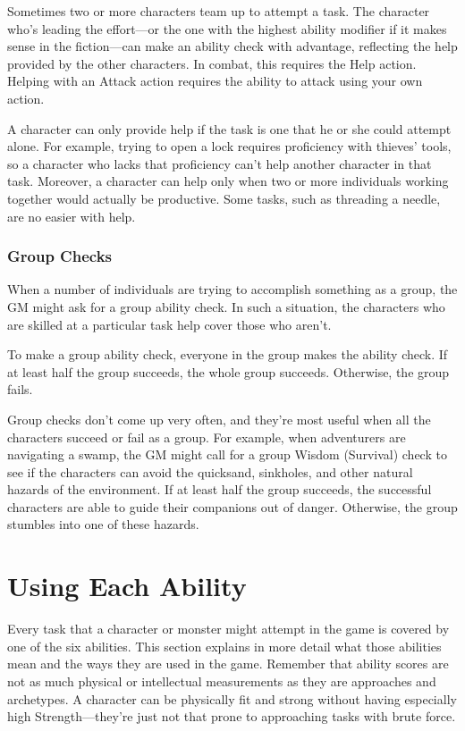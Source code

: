 Sometimes two or more characters team up to attempt a task. The character who's leading the effort---or the one with the highest ability modifier if it makes sense in the fiction---can make an ability check with advantage, reflecting the help provided by the other characters. In combat, this requires the Help action. Helping with an Attack action requires the ability to attack using your own action.

A character can only provide help if the task is one that he or she could attempt alone. For example, trying to open a lock requires proficiency with thieves' tools, so a character who lacks that proficiency can't help another character in that task. Moreover, a character can help only when two or more individuals working together would actually be productive. Some tasks, such as threading a needle, are no easier with help.

\subsubsection{Group Checks}

When a number of individuals are trying to accomplish something as a group, the GM might ask for a group ability check. In such a situation, the characters who are skilled at a particular task help cover those who aren't.

To make a group ability check, everyone in the group makes the ability check. If at least half the group succeeds, the whole group succeeds. Otherwise, the group fails.

Group checks don't come up very often, and they're most useful when all the characters succeed or fail as a group. For example, when adventurers are navigating a swamp, the GM might call for a group Wisdom (Survival) check to see if the characters can avoid the quicksand, sinkholes, and other natural hazards of the environment. If at least half the group succeeds, the successful characters are able to guide their companions out of danger. Otherwise, the group stumbles into one of these hazards.

\section{Using Each Ability}

Every task that a character or monster might attempt in the game is covered by one of the six abilities. This section explains in more detail what those abilities mean and the ways they are used in the game. Remember that ability scores are not as much physical or intellectual measurements as they are approaches and archetypes. A character can be physically fit and strong without having especially high Strength---they're just not that prone to approaching tasks with brute force.

